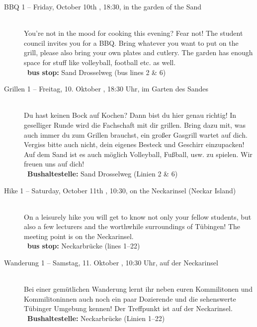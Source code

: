 \begin{description}
\ifml
    \item[BBQ 1 -- Friday, October 10th \YEAR, 18:30, in the garden of the Sand]~\\
    You're not in the mood for cooking this evening? Fear not!
    The student council invites you for a BBQ. Bring whatever you want to put on the grill,
    please also bring your own plates and cutlery. The garden has enough space for stuff like volleyball, football etc. as well.\\
    ~\textbf{bus stop:} Sand Drosselweg (bus lines 2 \& 6)
\else
    \item[Grillen 1 -- Freitag, 10. Oktober \YEAR, 18:30 Uhr, im Garten des Sandes]~\\
    Du hast keinen Bock auf Kochen? Dann bist du hier genau richtig! In geselliger Runde wird die Fachschaft mit dir grillen.
    Bring dazu mit, was auch immer du zum Grillen brauchst, ein großer Gasgrill wartet auf dich. Vergiss bitte auch nicht, dein eigenes Besteck und Geschirr einzupacken!\\
    Auf dem Sand ist es auch möglich Volleyball, Fußball, usw. zu spielen. Wir freuen uns auf dich!\\
    ~\textbf{Bushaltestelle:} Sand Drosselweg (Linien 2 \& 6)
\fi

\ifml
	\item[Hike 1 -- Saturday, October 11th \YEAR, 10:30, on the Neckarinsel (Neckar Island)]~\\
	On a leisurely hike you will get to know not only your fellow students,
	but also a few lecturers and the worthwhile surroundings of Tübingen!
	The meeting point is on the Neckarinsel.\\
	~\textbf{bus stop:} Neckarbrücke (lines 1--22)
\else
	\item[Wanderung 1 -- Samstag, 11. Oktober \YEAR, 10:30 Uhr, auf der Neckarinsel]~\\
	Bei einer gemütlichen Wanderung lernt ihr neben euren Kommilitonen und Kommilitoninnen auch
	noch ein paar Dozierende und die sehenswerte Tübinger Umgebung kennen!
	Der Treffpunkt ist auf der Neckarinsel.\\
	~\textbf{Bushaltestelle:} Neckarbrücke (Linien 1--22)
\fi



\end{description}
